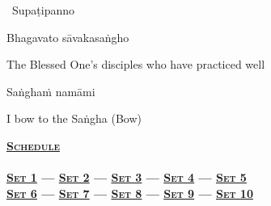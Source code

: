 \begin{leader}
  \anglebracketleft\ \hspace{-0.5mm}Supaṭipanno \hspace{-0.5mm}\anglebracketright\
\end{leader}

\vspace{-0.5cm}

Bhagavato sāvakasaṅgho

\begin{english}
  The Blessed One's disciples who have practiced well
\end{english}

Saṅghaṁ namāmi

\begin{english}
  I bow to the Saṅgha \hfill{(Bow)}\\
\end{english}

\null
\vfill

\ifdesktopversion
\begin{minipage}[b][25pt][c]{\linewidth}
  \begin{leader}
    \textbf{\vspace{0.2em}\textsc{\hyperref[schedule]{Schedule}\\
        {\centering{}}\\
        \vspace{0.8em}
        \hyperref[buddhas-first-exclamation]{Set 1} \hspace{0.02cm} — \hspace{0.02cm} \hyperref[characteristic-of-not-self]{Set 2} \hspace{0.02cm} — \hspace{0.02cm} \hyperref[noble-eightfold-path]{Set 3} \hspace{0.02cm} — \hspace{0.02cm} \hyperref[dedication-of-offerings]{Set 4} \hspace{0.02cm} — \hspace{0.02cm} \hyperref[mindfulness-of-breathing]{Set 5}\\
        \vspace{0.5em}
        \hyperref[anatta-lakkhana]{Set 6} — \hyperref[dependent-origination]{Set 7} — \hyperref[aditta-pariyaya]{Set 8} — \hyperref[deva-aradhana]{Set 9} — \hyperref[pubba-bhaga-nama-kara-patho]{Set 10}}}
  \end{leader}
\end{minipage}
\fi

